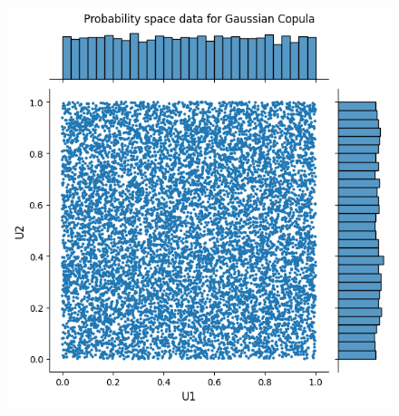 \begin{figure}
\begin{minipage}{0.4\textwidth}
        \label{fig:CorrelatedScatter}
    \end{minipage}
    \vfill
    \begin{minipage}{0.4\textwidth}
        \centering
        \includegraphics[width=\textwidth]{3Theory/pictures/IndependentProbSpace.png}
        \label{fig:UncorrelatedUniformScatter}
    \end{minipage}
    \hfill
    \begin{minipage}{0.4\textwidth}
        \centering

\end{minipage}
\end{figure}

